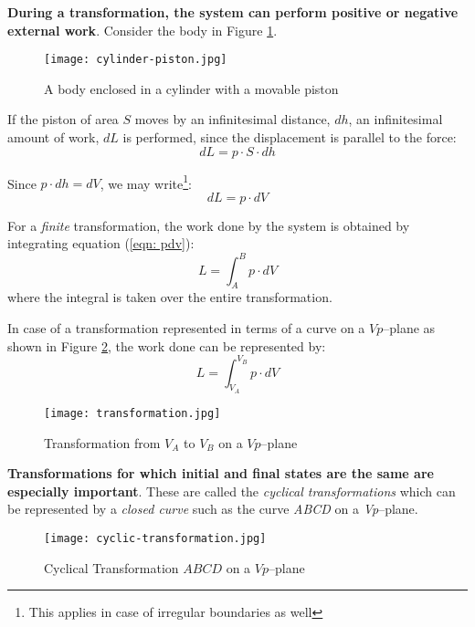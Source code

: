 \documentclass[11pt]{article}         %
\begin{document}
\textbf{During a transformation, the system can perform positive or negative external work}. Consider the body in Figure \ref{fig: cylinder-and-piston}.
\begin{figure}[ht!]
    \centering
    \texttt{[image: cylinder-piston.jpg]}
    \caption{A body enclosed in a cylinder with a movable piston}
    \label{fig: cylinder-and-piston}
\end{figure}

If the piston of area $S$ moves by an infinitesimal distance, $dh$, an infinitesimal amount of work, $dL$ is performed, since the displacement is parallel to the force:
\begin{equation}
\label{eqn: dl}
    dL = p\cdot S\cdot dh
\end{equation}

Since $p\cdot dh = dV$, we may write\footnote{This applies in case of irregular boundaries as well}:
\begin{equation}
\label{eqn: pdv}
    dL = p\cdot dV
\end{equation}

For a \emph{finite} transformation, the work done by the system is obtained by integrating equation (\ref{eqn: pdv}):
\begin{equation}
\label{eqn: work-done}
    L = \int_{A}^{B}p\cdot dV
\end{equation}
where the integral is taken over the entire transformation.

In case of a transformation represented in terms of a curve on a $Vp$--plane as shown in Figure \ref{fig: transformation}, the work done can be represented by:
\begin{equation}
\label{eqn: transformation-work-done}
    L = \int_{V_A}^{V_B}p\cdot dV
\end{equation}

\begin{figure}[ht!]
    \centering
    \texttt{[image: transformation.jpg]}
    \caption{Transformation from $V_A$ to $V_B$ on a $Vp$--plane}
    \label{fig: transformation}
\end{figure}

\textbf{Transformations for which initial and final states are the same are especially important}. These are called the \emph{cyclical transformations} which can be represented by a \emph{closed curve} such as the curve \emph{ABCD} on a \emph{Vp}--plane.


\begin{figure}[ht!]
    \centering
    \texttt{[image: cyclic-transformation.jpg]}
    \caption{Cyclical Transformation $ABCD$ on a $Vp$--plane}
    \label{fig: cyclic-transformation}
\end{figure}
\end{document}
